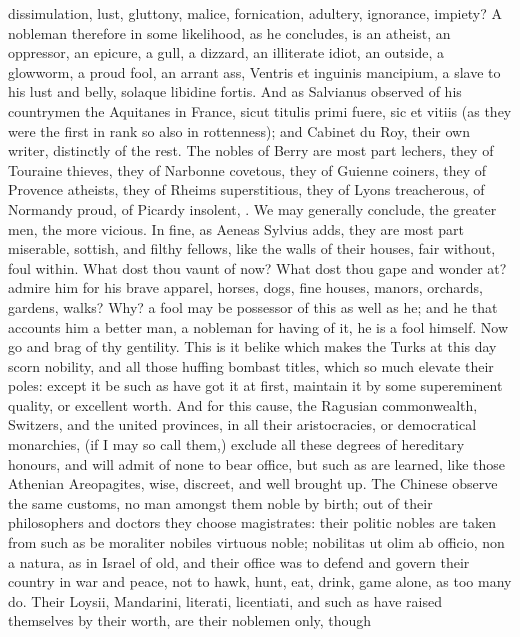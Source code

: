 {dissimulation, lust, gluttony, malice, fornication, adultery,
ignorance, impiety? A nobleman therefore in some likelihood, as he
concludes, is an atheist, an oppressor, an epicure, a gull, a
dizzard, an illiterate idiot, an outside, a glowworm, a proud fool, an
arrant ass, Ventris et inguinis mancipium, a slave to his lust and
belly, solaque libidine fortis. And as Salvianus observed of his
countrymen the Aquitanes in France, sicut titulis primi fuere, sic et
vitiis (as they were the first in rank so also in rottenness); and
Cabinet du Roy, their own writer, distinctly of the rest. The nobles of
Berry are most part lechers, they of Touraine thieves, they of Narbonne
covetous, they of Guienne coiners, they of Provence atheists, they of
Rheims superstitious, they of Lyons treacherous, of Normandy proud, of
Picardy insolent, \etc{}. We may generally conclude, the greater men, the
more vicious. In fine, as Aeneas Sylvius adds, they are most part
miserable, sottish, and filthy fellows, like the walls of their houses,
fair without, foul within. What dost thou vaunt of now? What dost
thou gape and wonder at? admire him for his brave apparel, horses,
dogs, fine houses, manors, orchards, gardens, walks? Why? a fool may be
possessor of this as well as he; and he that accounts him a better man,
a nobleman for having of it, he is a fool himself. Now go and brag of
thy gentility. This is it belike which makes the Turks at this
day scorn nobility, and all those huffing bombast titles, which so much
elevate their poles: except it be such as have got it at first,
maintain it by some supereminent quality, or excellent worth. And for
this cause, the Ragusian commonwealth, Switzers, and the united
provinces, in all their aristocracies, or democratical monarchies, (if
I may so call them,) exclude all these degrees of hereditary honours,
and will admit of none to bear office, but such as are learned, like
those Athenian Areopagites, wise, discreet, and well brought up. The
Chinese observe the same customs, no man amongst them noble by
birth; out of their philosophers and doctors they choose magistrates:
their politic nobles are taken from such as be moraliter nobiles
virtuous noble; nobilitas ut olim ab officio, non a natura, as in
Israel of old, and their office was to defend and govern their country
in war and peace, not to hawk, hunt, eat, drink, game alone, as too
many do. Their Loysii, Mandarini, literati, licentiati, and such as
have raised themselves by their worth, are their noblemen only, though
}
